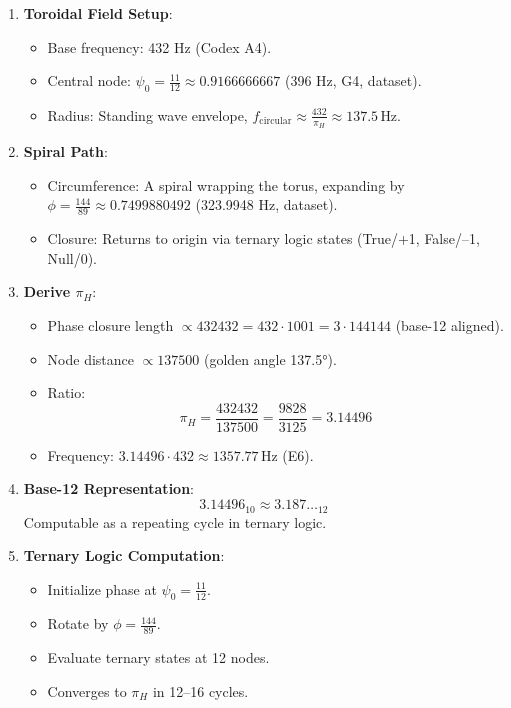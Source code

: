 \documentclass[a4paper,12pt]{book}
\begin{document}
\begin{enumerate}
    \item \textbf{Toroidal Field Setup}:
    \begin{itemize}
        \item Base frequency: 432 Hz (Codex A4).
        \item Central node: \(\psi_0 = \frac{11}{12} \approx 0.9166666667\) (396 Hz, G4, dataset).
        \item Radius: Standing wave envelope, \( f_{\text{circular}} \approx \frac{432}{\pi_H} \approx 137.5 \, \text{Hz} \).
    \end{itemize}
    
    \item \textbf{Spiral Path}:
    \begin{itemize}
        \item Circumference: A spiral wrapping the torus, expanding by \(\phi = \frac{144}{89} \approx 0.7499880492\) (323.9948 Hz, dataset).
        \item Closure: Returns to origin via ternary logic states (True/+1, False/–1, Null/0).
    \end{itemize}
    
    \item \textbf{Derive \(\pi_H\)}:
    \begin{itemize}
        \item Phase closure length \(\propto 432432 = 432 \cdot 1001 = 3 \cdot 144144\) (base-12 aligned).
        \item Node distance \(\propto 137500\) (golden angle 137.5°).
        \item Ratio:
        \[
        \pi_H = \frac{432432}{137500} = \frac{9828}{3125} = 3.14496
        \]
        \item Frequency: \( 3.14496 \cdot 432 \approx 1357.77 \, \text{Hz} \) (E6).
    \end{itemize}
    
    \item \textbf{Base-12 Representation}:
    \[
    3.14496_{10} \approx 3.187\ldots_{12}
    \]
    Computable as a repeating cycle in ternary logic.
    
    \item \textbf{Ternary Logic Computation}:
    \begin{itemize}
        \item Initialize phase at \(\psi_0 = \frac{11}{12}\).
        \item Rotate by \(\phi = \frac{144}{89}\).
        \item Evaluate ternary states at 12 nodes.
        \item Converges to \(\pi_H\) in 12–16 cycles.
    \end{itemize}
    

\end{enumerate}
\end{document}
